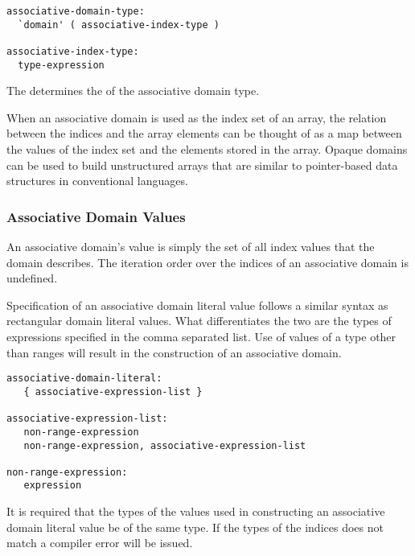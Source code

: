 \begin{syntax}
\begin{verbatim}
associative-domain-type:
  `domain' ( associative-index-type )

associative-index-type:
  type-expression
\end{verbatim}
\end{syntax}

The  determines the 
of the associative domain type.

When an associative domain is used as the index set of an array, the relation
between the indices and the array elements can be thought of as a map between
the values of the index set and the elements stored in the array.
Opaque domains can be used to build unstructured arrays that are similar to
pointer-based data structures in conventional languages.

\subsubsection{Associative Domain Values}
\label{Associative_Domain_Values}

An associative domain's value is simply the set of all index values
that the domain describes.  The iteration order over the indices of
an associative domain is undefined.


Specification of an associative domain literal value follows a similar syntax as
rectangular domain literal values.  What differentiates the two are the types 
of expressions specified in the comma separated list.  Use of values of a 
type other than ranges will result in the construction of an associative domain.  

\begin{syntax}
\begin{verbatim}
associative-domain-literal:
   { associative-expression-list }

associative-expression-list:
   non-range-expression
   non-range-expression, associative-expression-list

non-range-expression:
   expression
\end{verbatim}
\end{syntax}

It is required that the types of the values used in constructing an associative
domain literal value be of the same type.  If the types of the indices does not
match a compiler error will be issued.

